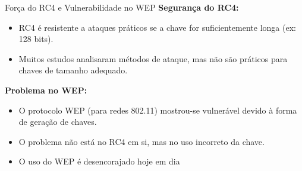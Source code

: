 \begin{frame}{Força do RC4 e Vulnerabilidade no WEP}
    \textbf{Segurança do RC4:}
    \begin{itemize}
        \item RC4 é resistente a ataques práticos se a chave for suficientemente longa (ex: 128 bits).
        \item Muitos estudos analisaram métodos de ataque, mas não são práticos para chaves de tamanho adequado.
    \end{itemize}

    \textbf{Problema no WEP:}
    \begin{itemize}
        \item O protocolo WEP (para redes 802.11) mostrou-se vulnerável devido à forma de geração de chaves.
        \item O problema não está no RC4 em si, mas no uso incorreto da chave.
        \item O uso do WEP é desencorajado hoje em dia
    \end{itemize}


\end{frame}
